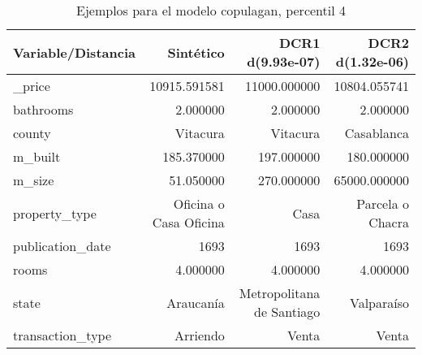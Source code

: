 \begin{table}[H]
\centering
\fontsize{10}{14}\selectfont
\caption{Ejemplos para el modelo copulagan, percentil 4}
\label{table-example-economicos-a-3-copulagan-4p}
\begin{tabular}{|l|r|r|r|}
\hline
\rowcolor[gray]{0.8}
Variable/Distancia & Sintético & DCR1 d(9.93e-07) & DCR2 d(1.32e-06) \\
\hline \_price & \cellcolor[rgb]{0.9, 0.54, 0.52} 10915.591581 & 11000.000000 & 10804.055741 \\
\hline bathrooms & \cellcolor[rgb]{0.9, 0.54, 0.52} 2.000000 & \cellcolor[rgb]{0.9, 0.54, 0.52} 2.000000 & \cellcolor[rgb]{0.9, 0.54, 0.52} 2.000000 \\
\hline county & \cellcolor[rgb]{0.9, 0.54, 0.52} Vitacura & \cellcolor[rgb]{0.9, 0.54, 0.52} Vitacura & Casablanca \\
\hline m\_built & \cellcolor[rgb]{0.9, 0.54, 0.52} 185.370000 & 197.000000 & 180.000000 \\
\hline m\_size & \cellcolor[rgb]{0.9, 0.54, 0.52} 51.050000 & 270.000000 & 65000.000000 \\
\hline property\_type & \cellcolor[rgb]{0.9, 0.54, 0.52} Oficina o Casa Oficina & Casa & Parcela o Chacra \\
\hline publication\_date & \cellcolor[rgb]{0.9, 0.54, 0.52} 1693 & \cellcolor[rgb]{0.9, 0.54, 0.52} 1693 & \cellcolor[rgb]{0.9, 0.54, 0.52} 1693 \\
\hline rooms & \cellcolor[rgb]{0.9, 0.54, 0.52} 4.000000 & \cellcolor[rgb]{0.9, 0.54, 0.52} 4.000000 & \cellcolor[rgb]{0.9, 0.54, 0.52} 4.000000 \\
\hline state & \cellcolor[rgb]{0.9, 0.54, 0.52} Araucanía & Metropolitana de Santiago & Valparaíso \\
\hline transaction\_type & \cellcolor[rgb]{0.9, 0.54, 0.52} Arriendo & Venta & Venta \\
\hline
\end{tabular}
\end{table}

